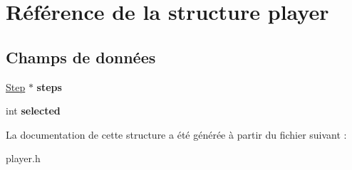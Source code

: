 \hypertarget{structplayer}{\section{Référence de la structure player}
\label{structplayer}
}
\subsection*{Champs de données}
\begin{DoxyCompactItemize}
\item 
\hypertarget{structplayer_a9e027465ed2f9e1258ba283809c118df}{\hyperlink{struct_step}{Step} $\ast$ {\bfseries steps}}\label{structplayer_a9e027465ed2f9e1258ba283809c118df}

\item 
\hypertarget{structplayer_adab4da51ba40d5a492becdceccccbfcd}{int {\bfseries selected}}\label{structplayer_adab4da51ba40d5a492becdceccccbfcd}

\end{DoxyCompactItemize}


La documentation de cette structure a été générée à partir du fichier suivant \-:\begin{DoxyCompactItemize}
\item 
player.\-h\end{DoxyCompactItemize}
